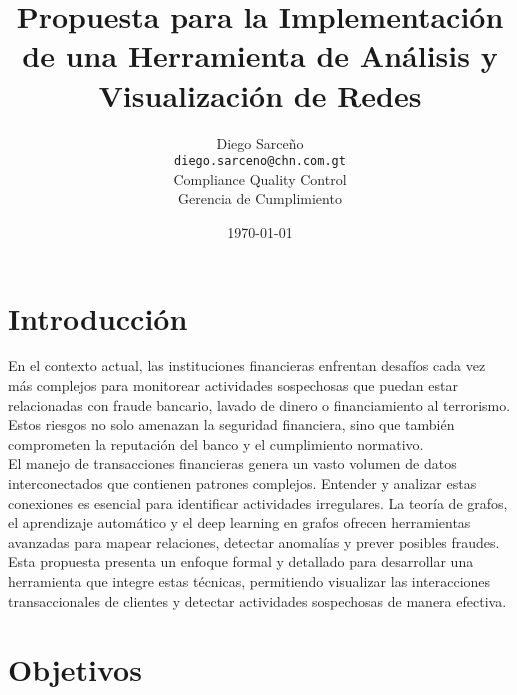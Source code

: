 


\title{Propuesta para la Implementación de una Herramienta de Análisis y Visualización de Redes}
\author{\large{Diego Sarceño}\\\texttt{diego.sarceno@chn.com.gt}\\Compliance Quality Control\\\small{Gerencia de Cumplimiento}}
\date{\today}




\maketitle
\tableofcontents
\pagebreak

\section{Introducción}
En el contexto actual, las instituciones financieras enfrentan desafíos cada vez más complejos para monitorear actividades sospechosas que puedan estar relacionadas con fraude bancario, lavado de dinero o financiamiento al terrorismo. Estos riesgos no solo amenazan la seguridad financiera, sino que también comprometen la reputación del banco y el cumplimiento normativo.\\

El manejo de transacciones financieras genera un vasto volumen de datos interconectados que contienen patrones complejos. Entender y analizar estas conexiones es esencial para identificar actividades irregulares. La teoría de grafos, el aprendizaje automático y el deep learning en grafos ofrecen herramientas avanzadas para mapear relaciones, detectar anomalías y prever posibles fraudes. \\

Esta propuesta presenta un enfoque formal y detallado para desarrollar una herramienta que integre estas técnicas, permitiendo visualizar las interacciones transaccionales de clientes y detectar actividades sospechosas de manera efectiva.


\section{Objetivos}

